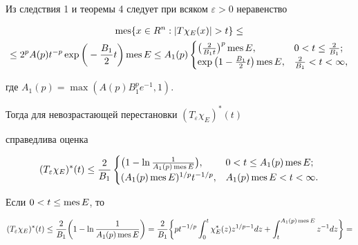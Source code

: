  


\begin{pf} 


Из следствия 1 и теоремы 4 следует при всяком $\varepsilon>0$ неравенство 


\begin{multline*} 


\mes\{x\in R^n:|T\chi_E(x)|>t\}\le \\ \le


2^p A(p)t^{-p}\exp\bigg(-\frac{B_1}{2}t \bigg)\mes E\le A_1(p) 


\begin{cases} 


\big(\frac{2}{B_1t}\big)^p\mes E, & 0<t\le\frac{2}{B_1}; \\ 


\exp\big(1-\frac{B_1}{2}t\big)\mes E, & \frac{2}{B_1}<t<\infty, 


\end{cases} 


\end{multline*}  


где $A_1(p)=\max(A(p)B^p_1e^{-1},1)$. 


Тогда для невозрастающей перестановки $(T_\varepsilon\chi_E)^*(t)$ 


справедлива оценка 


\begin{equation} 


(T_\varepsilon\chi_E)^*(t)\le\frac{2}{B_1} 


\begin{cases} 


\big(1-\ln\frac{1}{A_1(p)\mes E}\big), & 0<t\le A_1(p)\mes E;\\ 


(A_1(p)\mes E)^{1/p}t^{-1/p}, & A_1(p)\mes E<t<\infty. 


\end{cases} 


\end{equation} 


Если $0<t\le\operatorname{mes} E$, то 


\begin{multline*} 


(T_\varepsilon\chi_E)^*(t)\le\frac{2}{B_1} 


\bigg(1-\ln\frac{1}{A_1(p)\mes E} \bigg)=\frac{2}{B_1}\bigg\{ 


p t^{-1/p}\int^t_0 \chi^*_E(z)z^{1/p-1}d z+ 


\int^{A_1(p)\mes E}_t z^{-1}d z\bigg\}= \\ 



\end{multline*}
\end{pf}
